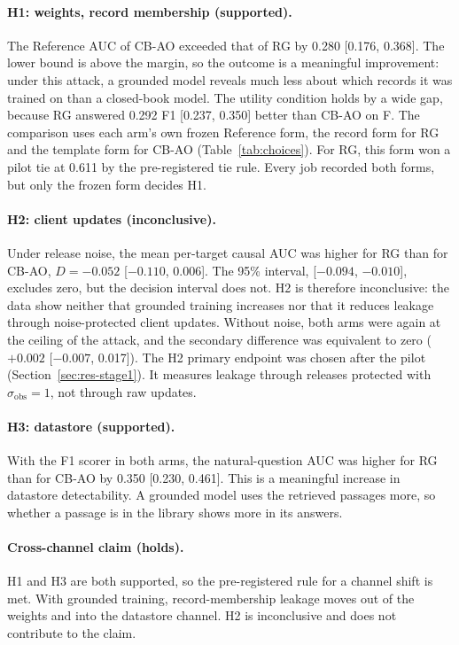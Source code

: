 \documentclass[11pt]{article}
\begin{document}
\paragraph{H1: weights, record membership (supported).} The Reference AUC of CB-AO exceeded that of RG by 0.280 [0.176, 0.368]. The lower bound is above the margin, so the outcome is a meaningful improvement: under this attack, a grounded model reveals much less about which records it was trained on than a closed-book model. The utility condition holds by a wide gap, because RG answered 0.292 F1 [0.237, 0.350] better than CB-AO on F. The comparison uses each arm's own frozen Reference form, the record form for RG and the template form for CB-AO (Table~\ref{tab:choices}). For RG, this form won a pilot tie at 0.611 by the pre-registered tie rule. Every job recorded both forms, but only the frozen form decides H1.

\paragraph{H2: client updates (inconclusive).} Under release noise, the mean per-target causal AUC was higher for RG than for CB-AO, $D=-0.052$ [$-0.110$, 0.006]. The 95\% interval, [$-0.094$, $-0.010$], excludes zero, but the decision interval does not. H2 is therefore inconclusive: the data show neither that grounded training increases nor that it reduces leakage through noise-protected client updates. Without noise, both arms were again at the ceiling of the attack, and the secondary difference was equivalent to zero ($+0.002$ [$-0.007$, 0.017]). The H2 primary endpoint was chosen after the pilot (Section~\ref{sec:res-stage1}). It measures leakage through releases protected with $\sigma_{\mathrm{obs}}=1$, not through raw updates.

\paragraph{H3: datastore (supported).} With the F1 scorer in both arms, the natural-question AUC was higher for RG than for CB-AO by 0.350 [0.230, 0.461]. This is a meaningful increase in datastore detectability. A grounded model uses the retrieved passages more, so whether a passage is in the library shows more in its answers.

\paragraph{Cross-channel claim (holds).} H1 and H3 are both supported, so the pre-registered rule for a channel shift is met. With grounded training, record-membership leakage moves out of the weights and into the datastore channel. H2 is inconclusive and does not contribute to the claim.
\end{document}

